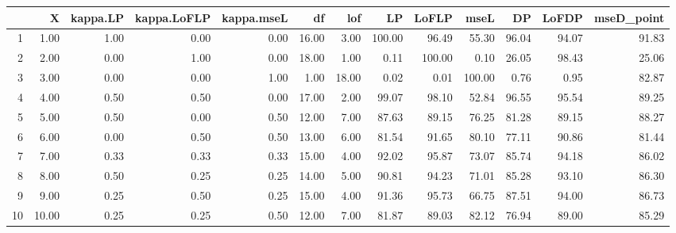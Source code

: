 \begin{table}[ht]
\centering
\begin{tabular}{rrrrrrrrrrrrr}
  \hline
 & X & kappa.LP & kappa.LoFLP & kappa.mseL & df & lof & LP & LoFLP & mseL & DP & LoFDP & mseD\_point \\ 
  \hline
1 & 1.00 & 1.00 & 0.00 & 0.00 & 16.00 & 3.00 & 100.00 & 96.49 & 55.30 & 96.04 & 94.07 & 91.83 \\ 
  2 & 2.00 & 0.00 & 1.00 & 0.00 & 18.00 & 1.00 & 0.11 & 100.00 & 0.10 & 26.05 & 98.43 & 25.06 \\ 
  3 & 3.00 & 0.00 & 0.00 & 1.00 & 1.00 & 18.00 & 0.02 & 0.01 & 100.00 & 0.76 & 0.95 & 82.87 \\ 
  4 & 4.00 & 0.50 & 0.50 & 0.00 & 17.00 & 2.00 & 99.07 & 98.10 & 52.84 & 96.55 & 95.54 & 89.25 \\ 
  5 & 5.00 & 0.50 & 0.00 & 0.50 & 12.00 & 7.00 & 87.63 & 89.15 & 76.25 & 81.28 & 89.15 & 88.27 \\ 
  6 & 6.00 & 0.00 & 0.50 & 0.50 & 13.00 & 6.00 & 81.54 & 91.65 & 80.10 & 77.11 & 90.86 & 81.44 \\ 
  7 & 7.00 & 0.33 & 0.33 & 0.33 & 15.00 & 4.00 & 92.02 & 95.87 & 73.07 & 85.74 & 94.18 & 86.02 \\ 
  8 & 8.00 & 0.50 & 0.25 & 0.25 & 14.00 & 5.00 & 90.81 & 94.23 & 71.01 & 85.28 & 93.10 & 86.30 \\ 
  9 & 9.00 & 0.25 & 0.50 & 0.25 & 15.00 & 4.00 & 91.36 & 95.73 & 66.75 & 87.51 & 94.00 & 86.73 \\ 
  10 & 10.00 & 0.25 & 0.25 & 0.50 & 12.00 & 7.00 & 81.87 & 89.03 & 82.12 & 76.94 & 89.00 & 85.29 \\ 
   \hline
\end{tabular}
\end{table}
